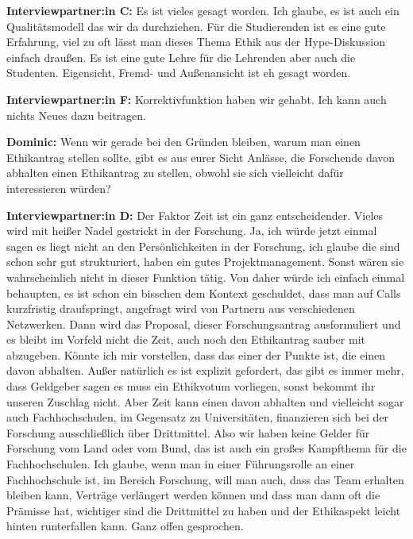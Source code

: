 \documentclass[a4paper,12pt,twoside]{scrreprt}
\begin{document}
\textbf{Interviewpartner:in C:} Es ist vieles gesagt worden. Ich glaube, es ist auch ein Qualitätsmodell das wir da durchziehen. Für die Studierenden ist es eine gute Erfahrung, viel zu oft lässt man dieses Thema Ethik aus der Hype-Diskussion einfach draußen. Es ist eine gute Lehre für die Lehrenden aber auch die Studenten. Eigensicht, Fremd- und Außenansicht ist eh gesagt worden.

\textbf{Interviewpartner:in F:} Korrektivfunktion haben wir gehabt. Ich kann auch nichts Neues dazu beitragen.

\textbf{Dominic:} Wenn wir gerade bei den Gründen bleiben, warum man einen Ethikantrag stellen sollte, gibt es aus eurer Sicht Anlässe, die Forschende davon abhalten einen Ethikantrag zu stellen, obwohl sie sich vielleicht dafür interessieren würden?

\textbf{Interviewpartner:in D:} Der Faktor Zeit ist ein ganz entscheidender. Vieles wird mit heißer Nadel gestrickt in der Forschung. Ja, ich würde jetzt einmal sagen es liegt nicht an den Persönlichkeiten in der Forschung, ich glaube die sind schon sehr gut strukturiert, haben ein gutes Projektmanagement. Sonst wären sie wahrscheinlich nicht in dieser Funktion tätig. Von daher würde ich einfach einmal behaupten, es ist schon ein bisschen dem Kontext geschuldet, dass man auf Calls kurzfristig draufspringt, angefragt wird von Partnern aus verschiedenen Netzwerken. Dann wird das Proposal, dieser Forschungsantrag ausformuliert und es bleibt im Vorfeld nicht die Zeit, auch noch den Ethikantrag sauber mit abzugeben. Könnte ich mir vorstellen, dass das einer der Punkte ist, die einen davon abhalten. Außer natürlich es ist explizit gefordert, das gibt es immer mehr, dass Geldgeber sagen es muss ein Ethikvotum vorliegen, sonst bekommt ihr unseren Zuschlag nicht. Aber Zeit kann einen davon abhalten und vielleicht sogar auch Fachhochschulen, im Gegensatz zu Universitäten, finanzieren sich bei der Forschung ausschließlich über Drittmittel. Also wir haben keine Gelder für Forschung vom Land oder vom Bund, das ist auch ein großes Kampfthema für die Fachhochschulen. Ich glaube, wenn man in einer Führungsrolle an einer Fachhochschule ist, im Bereich Forschung, will man auch, dass das Team erhalten bleiben kann, Verträge verlängert werden können und dass man dann oft die Prämisse hat, wichtiger sind die Drittmittel zu haben und der Ethikaspekt leicht hinten runterfallen kann. Ganz offen gesprochen.
\end{document}
